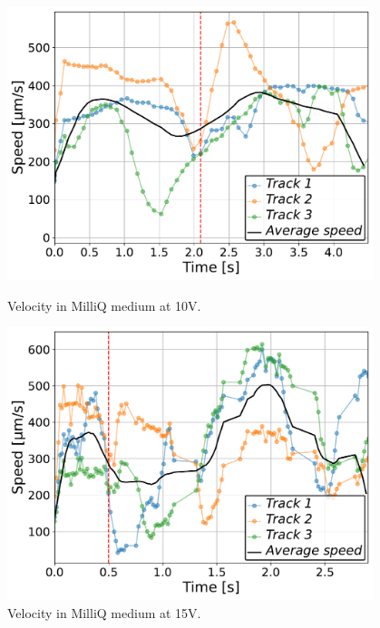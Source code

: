 \begin{figure}[H]
    \centering
    \begin{minipage}[t]{0.49\textwidth}
        \centering
        \includegraphics[width=0.95\textwidth]{Figures/MQ_10V_002_velocity_time.pdf}
        \caption{Velocity in MilliQ medium at 10V.}
        \label{fig:velocity_time_MQ_10V}
    \end{minipage}
    \hfill
    \begin{minipage}[t]{0.49\textwidth}
        \centering
        \includegraphics[width=0.95\textwidth]{Figures/MQ_15V_003_velocity_time.pdf}
        \caption{Velocity in MilliQ medium at 15V.}
        \label{fig:velocity_time_MQ_15V}
    \end{minipage}
\end{figure}

